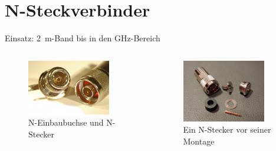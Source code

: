
\section{N-Steckverbinder}
\label{section:steckverbinder_n}
\begin{frame}%
Einsatz: \qty{2}{\metre}-Band bis in den GHz-Bereich
\begin{columns}
    \begin{column}{0.48\textwidth}
    
\begin{figure}
    \includegraphics[width=0.85\textwidth]{foto/73}
    \caption{\scriptsize N-Einbaubuchse und N-Stecker}
    \label{n_koaxsteckverbinder_n_buchse_und_stecker}
\end{figure}

    \end{column}
   \begin{column}{0.48\textwidth}
       
\begin{figure}
    \includegraphics[width=0.85\textwidth]{foto/72}
    \caption{\scriptsize Ein N-Stecker vor seiner Montage}
    \label{n_koaxsteckverbinder_n_stecker}
\end{figure}

   \end{column}
\end{columns}

\end{frame}

